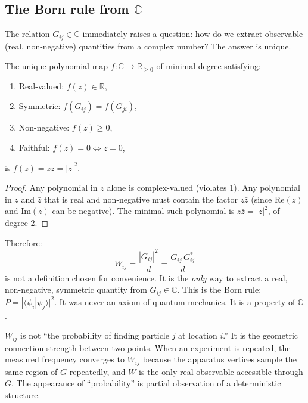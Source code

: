 \subsection{The Born rule from $\mathbb{C}$}

The relation $G_{ij} \in \mathbb{C}$ immediately raises a question: how do we extract observable (real, non-negative) quantities from a complex number? The answer is unique.

\begin{theorem}
The unique polynomial map $f: \mathbb{C} \to \mathbb{R}_{\geq 0}$ of minimal degree satisfying:
\begin{enumerate}
\item Real-valued: $f(z) \in \mathbb{R}$,
\item Symmetric: $f(G_{ij}) = f(G_{ji})$,
\item Non-negative: $f(z) \geq 0$,
\item Faithful: $f(z) = 0 \Leftrightarrow z = 0$,
\end{enumerate}
is $f(z) = z\bar{z} = |z|^2$.
\end{theorem}

\begin{proof}
Any polynomial in $z$ alone is complex-valued (violates 1). Any polynomial in $z$ and $\bar{z}$ that is real and non-negative must contain the factor $z\bar{z}$ (since $\text{Re}(z)$ and $\text{Im}(z)$ can be negative). The minimal such polynomial is $z\bar{z} = |z|^2$, of degree 2.
\end{proof}

Therefore:
\begin{equation}
W_{ij} = \frac{|G_{ij}|^2}{d} = \frac{G_{ij}\,G^*_{ij}}{d}
\end{equation}
is not a definition chosen for convenience. It is the \emph{only} way to extract a real, non-negative, symmetric quantity from $G_{ij} \in \mathbb{C}$. This is the Born rule: $P = |\langle\psi_i|\psi_j\rangle|^2$. It was never an axiom of quantum mechanics. It is a property of $\mathbb{C}$.

\begin{remark}
$W_{ij}$ is not ``the probability of finding particle $j$ at location $i$.'' It is the geometric connection strength between two points. When an experiment is repeated, the measured frequency converges to $W_{ij}$ because the apparatus vertices sample the same region of $G$ repeatedly, and $W$ is the only real observable accessible through $G$. The appearance of ``probability'' is partial observation of a deterministic structure.
\end{remark}


